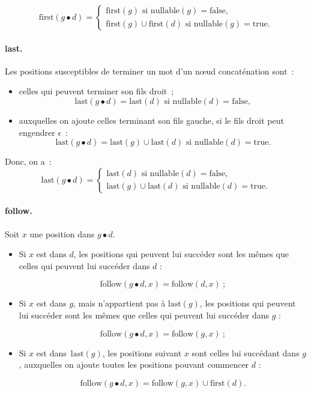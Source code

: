 $$
\mbox{first}(g\bullet d)=\left\{
\begin{array}{l}
\mbox{first}(g) \mbox{ si } \mbox{nullable}(g)= \mbox{false}, \\
\mbox{first}(g)\cup \mbox{first}(d) \mbox{ si } \mbox{nullable}(g)=\mbox{true}.
\end{array}
\right.
$$
\paragraph{last.}
Les positions susceptibles de terminer un mot d'un n\oe{}ud concat{\'e}nation sont~:
\begin{itemize}
\item  celles qui peuvent terminer son fils droit~;
$$\mbox{last}(g\bullet d)=\mbox{last}(d) \mbox{ si } \mbox{nullable}(d)= \mbox{false},$$
\item auxquelles on ajoute celles terminant son fils gauche, si le fils droit peut engendrer $\epsilon$~:
$$\mbox{last}(g\bullet d)=\mbox{last}(g)\cup \mbox{last}(d) \mbox{ si } \mbox{nullable}(d)=\mbox{true}.$$
\end{itemize}
Donc, on a~:
$$\mbox{last}(g\bullet d)=\left\{
\begin{array}{l}
\mbox{last}(d) \mbox{ si } \mbox{nullable}(d)= \mbox{false},\\
\mbox{last}(g)\cup \mbox{last}(d) \mbox{ si } \mbox{nullable}(d)=\mbox{true}.
\end{array}
\right.
$$
\paragraph{follow.}
Soit $x$ une position dans $g\bullet d$. 
\begin{itemize}
\item Si $x$ est dans $d$, les positions qui peuvent lui succ{\'e}der sont les m{\^e}mes que celles qui peuvent lui succ\'eder dans $d$ : 

$$\mbox{follow}(g\bullet d,x)=\mbox{follow}(d,x)~;$$

\item Si $x$ est dans $g$, mais n'appartient pas {\`a} $\mbox{last}(g)$, les positions qui peuvent lui succ{\'e}der sont les m{\^e}mes que celles qui peuvent lui succ\'eder dans $g$ : 

$$\mbox{follow}(g\bullet d,x)=\mbox{follow}(g,x)~;$$

\item Si $x$ est dans~$\mbox{last}(g)$, les positions suivant $x$ sont celles lui succ{\'e}dant dans $g$, auxquelles on ajoute toutes les positions pouvant commencer $d$ : 

$$\mbox{follow}(g\bullet d,x)=\mbox{follow}(g,x) \cup \mbox{first}(d).$$

\end{itemize}

